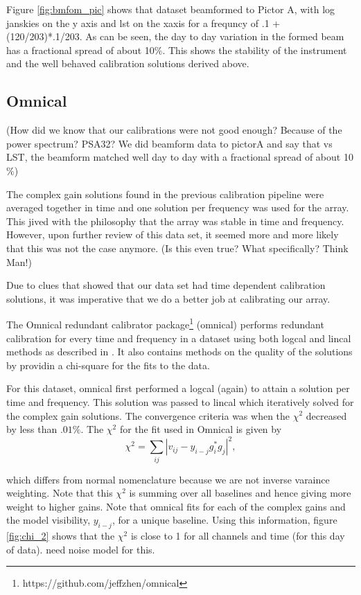 \documentclass[twocolumn,numberedappendix]{emulateapj}
\begin{document}
Figure \ref{fig:bmfom_pic} shows that dataset beamformed to Pictor A, with log
janskies on the y axis and lst on the xaxis for a frequncy of .1 + (120/203)*.1/203. 
As can be seen, the day to day variation in the formed beam has a fractional
spread of about 10$\%$.  This shows the stability of the instrument and the well
behaved calibration solutions derived above. 

\subsection{Omnical}
(How did we know that our calibrations were not good enough? Because of the power
spectrum? PSA32? We did beamform data to pictorA and say that vs LST, the
beamform matched well day to day with a fractional spread of about 10$\%$) 

The complex gain solutions found in the previous calibration pipeline were
averaged together in time and one solution per frequency was used for the array.
This jived with the philosophy that the array was stable in time and frequency.
However, upon further review of this data set, it seemed more and more likely
that this was not the case anymore. (Is this even true? What specifically? Think
Man!) 

Due to clues that showed that our data set had time dependent calibration
solutions, it was imperative that we do a better job at calibrating our array.

The Omnical redundant calibrator
package\footnote{https://github.com/jeffzhen/omnical} (omnical) performs
redundant calibration for every time and frequency in a dataset using both
logcal and lincal methods as described in \cite{zheng_et_al2014}. It also
contains methods on the quality of the solutions by providin a chi-square for
the fits to the data. 

For this dataset, omnical first performed a logcal (again) to attain a solution
per time and frequency. This solution was passed to lincal which iteratively
solved for the complex gain solutions. The convergence criteria was when the
$\chi^{2}$ decreased by less than $.01\%$. The $\chi^{2}$ for the fit used in
Omnical is given by 
\begin{equation}
    \chi^{2} = \sum_{ij}|v_{ij} - y_{i-j}g_{i}^{*}g_{j}|^{2},
\end{equation}

which differs from normal nomenclature because we are not inverse varaince
weighting. Note that this $\chi^{2}$ is summing over all baselines and hence 
giving more weight to higher gains. Note that omnical fits for each of the
complex gains and the model visibility, $y_{i-j}$,  for a unique baseline.
Using this information, figure \ref{fig:chi_2} shows that the $\chi^{2}$ is close
to 1 for all channels and time (for this day of data). need noise model for
this.
\end{document}
